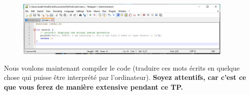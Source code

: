 \documentclass{article}
\begin{document}
\begin{figure}[H]
\center
\includegraphics[width=0.95\textwidth]{Plots/FirstCode_9.jpeg}
\end{figure}
Nous voulons maintenant compiler le code (traduire ces mots écrits en quelque chose qui puisse être interprété par l'ordinateur). {\color{Bittersweet}\textbf{Soyez attentifs, car c'est ce que vous ferez de manière extensive pendant ce TP.}}
\end{document}
